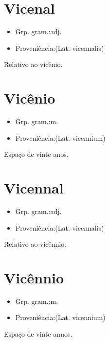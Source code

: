 \documentclass{article}
\begin{document}
\section{Vicenal}
\begin{itemize}
\item {Grp. gram.:adj.}
\end{itemize}
\begin{itemize}
\item {Proveniência:(Lat. \textunderscore vicennalis\textunderscore )}
\end{itemize}
Relativo ao vicênio.
\section{Vicênio}
\begin{itemize}
\item {Grp. gram.:m.}
\end{itemize}
\begin{itemize}
\item {Proveniência:(Lat. \textunderscore vicennium\textunderscore )}
\end{itemize}
Espaço de vinte anos.
\section{Vicennal}
\begin{itemize}
\item {Grp. gram.:adj.}
\end{itemize}
\begin{itemize}
\item {Proveniência:(Lat. \textunderscore vicennalis\textunderscore )}
\end{itemize}
Relativo ao vicênnio.
\section{Vicênnio}
\begin{itemize}
\item {Grp. gram.:m.}
\end{itemize}
\begin{itemize}
\item {Proveniência:(Lat. \textunderscore vicennium\textunderscore )}
\end{itemize}
Espaço de vinte annos.
\end{document}
